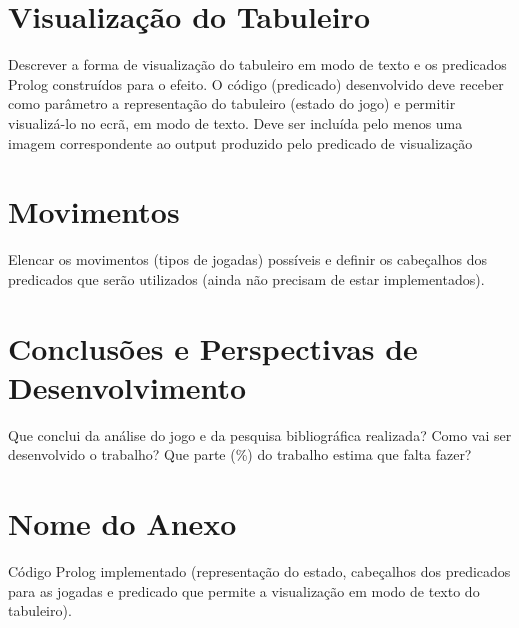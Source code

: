 \documentclass[a4paper]{article}
\begin{document}
\section{Visualização do Tabuleiro}
Descrever a forma de visualização do tabuleiro em modo de texto e os predicados Prolog construídos para o efeito. O código (predicado) desenvolvido deve receber como parâmetro a representação do tabuleiro (estado do jogo) e permitir visualizá-lo no ecrã, em modo de texto. Deve ser incluída pelo menos uma imagem correspondente ao output produzido pelo predicado de visualização

\section{Movimentos}
Elencar os movimentos (tipos de jogadas) possíveis e definir os cabeçalhos dos predicados que serão utilizados (ainda não precisam de estar implementados).

\section{Conclusões e Perspectivas de Desenvolvimento}
Que conclui da análise do jogo e da pesquisa bibliográfica realizada? Como vai ser desenvolvido o trabalho? Que parte (\%) do trabalho estima que falta fazer?

\clearpage
{}
\renewcommand\refname{Bibliografia}



\newpage
\appendix
\section{Nome do Anexo}
Código Prolog implementado (representação do estado, cabeçalhos dos predicados para as jogadas e predicado que permite a visualização em modo de texto do tabuleiro).
\end{document}
